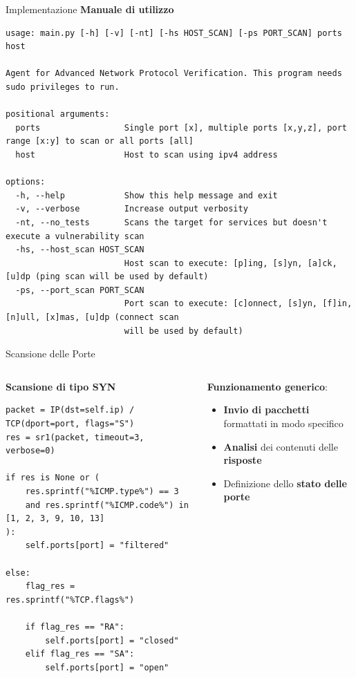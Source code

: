 \begin{frame}[fragile]{Implementazione}
\centering
\textbf{Manuale di utilizzo}
\begin{lstlisting}[style=statale, basicstyle=\tiny]
usage: main.py [-h] [-v] [-nt] [-hs HOST_SCAN] [-ps PORT_SCAN] ports host

Agent for Advanced Network Protocol Verification. This program needs sudo privileges to run.

positional arguments:
  ports                 Single port [x], multiple ports [x,y,z], port range [x:y] to scan or all ports [all]
  host                  Host to scan using ipv4 address

options:
  -h, --help            Show this help message and exit
  -v, --verbose         Increase output verbosity
  -nt, --no_tests       Scans the target for services but doesn't execute a vulnerability scan
  -hs, --host_scan HOST_SCAN
                        Host scan to execute: [p]ing, [s]yn, [a]ck, [u]dp (ping scan will be used by default)
  -ps, --port_scan PORT_SCAN
                        Port scan to execute: [c]onnect, [s]yn, [f]in, [n]ull, [x]mas, [u]dp (connect scan 
                        will be used by default)
\end{lstlisting}
\end{frame}


\begin{frame}[fragile]{Scansione delle Porte}
\begin{columns}
\begin{column}{0.5\textwidth}
\centering
\textbf{Scansione di tipo SYN}
\begin{lstlisting}[style=statalepython, basicstyle=\tiny]
packet = IP(dst=self.ip) / TCP(dport=port, flags="S")
res = sr1(packet, timeout=3, verbose=0)

if res is None or (
    res.sprintf("%ICMP.type%") == 3
    and res.sprintf("%ICMP.code%") in [1, 2, 3, 9, 10, 13]
):
    self.ports[port] = "filtered"

else:
    flag_res = res.sprintf("%TCP.flags%")

    if flag_res == "RA":
        self.ports[port] = "closed"
    elif flag_res == "SA":
        self.ports[port] = "open"
\end{lstlisting}
\end{column}
\begin{column}{0.5\textwidth}
\textbf{Funzionamento generico}:
\begin{itemize}
    \item \textbf{Invio di pacchetti} formattati in modo specifico
    \item \textbf{Analisi} dei contenuti delle \textbf{risposte}
    \item Definizione dello \textbf{stato delle porte}
\end{itemize}
\end{column}
\end{columns}
\end{frame}


